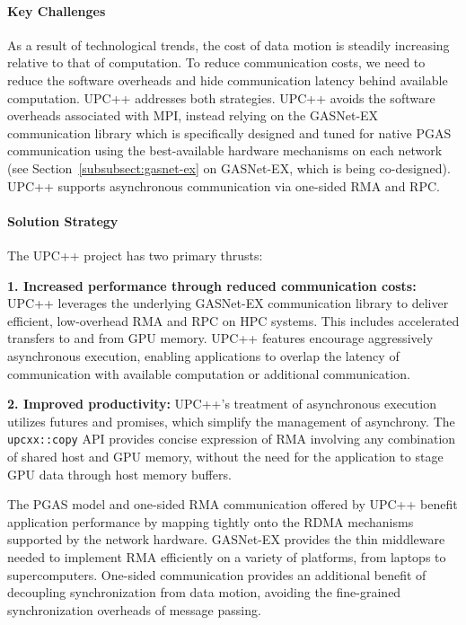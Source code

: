 \paragraph{Key Challenges}

As a result of technological trends, the cost of data motion is steadily increasing relative to that of computation.  To reduce communication costs, we need to 
reduce the software overheads and hide communication latency behind available computation. UPC++ addresses both strategies.
UPC++ avoids the software overheads associated with MPI, 
instead relying on the GASNet-EX~\cite{gasnet-site,gasnet-lcpc18}
communication library which is specifically designed and tuned
for native PGAS communication using the best-available hardware
mechanisms on each network
(see Section~\ref{subsubsect:gasnet-ex} on GASNet-EX, which is being co-designed).
UPC++ supports asynchronous communication via one-sided RMA and RPC.

\paragraph{Solution Strategy}

The UPC++ project has two primary thrusts:


\textbf{1. Increased performance through reduced communication costs:} 
UPC++ leverages the underlying GASNet-EX communication library to deliver efficient, low-overhead RMA and RPC on HPC systems.
This includes accelerated transfers to and from GPU memory.
UPC++ features encourage aggressively asynchronous execution,
enabling applications to overlap the latency of communication with
available computation or additional communication.

\textbf{2. Improved productivity:} UPC++'s treatment of asynchronous
execution utilizes futures and promises, which simplify the management of
asynchrony.
The \texttt{upcxx::copy} API provides concise expression of RMA involving any
combination of shared host and GPU memory, without the need for the application
to stage GPU data through host memory buffers.

The PGAS model and one-sided RMA communication offered by UPC++
benefit application performance by mapping tightly onto the RDMA mechanisms
supported by the network hardware. GASNet-EX provides the
thin middleware needed to implement RMA efficiently on a variety of platforms,
from laptops to supercomputers.
One-sided communication provides an additional benefit of
decoupling synchronization from data motion,
avoiding the fine-grained synchronization overheads of message passing.

